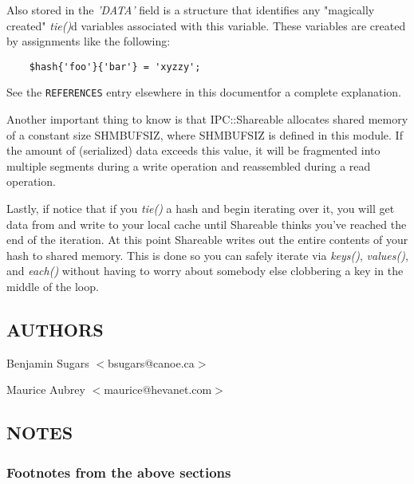 Also stored in the {\em 'DATA'\/} field is a structure that identifies any
"magically created" {\em tie()\/}d variables associated with this variable.
These variables are created by assignments like the following:
\begin{verbatim}
    $hash{'foo'}{'bar'} = 'xyzzy';
\end{verbatim}

See the {\tt REFERENCES} entry elsewhere in this documentfor a complete explanation.

Another important thing to know is that IPC::Shareable allocates
shared memory of a constant size SHM\underscore{}BUFSIZ, where SHM\underscore{}BUFSIZ is
defined in this module.  If the amount of (serialized) data exceeds
this value, it will be fragmented into multiple segments during a
write operation and reassembled during a read operation.

Lastly, if notice that if you {\em tie()\/} a hash and begin
iterating over it, you will get data from and write to
your local cache until Shareable thinks you've reached
the end of the iteration.  At this point Shareable
writes out the entire contents of your hash to shared
memory.  This is done so you can safely iterate via
{\em keys()\/}, {\em values()\/}, and {\em each()\/} without having to worry
about somebody else clobbering a key in the middle of
the loop.

\subsection*{AUTHORS}
Benjamin Sugars $<$bsugars@canoe.ca$>$

Maurice Aubrey $<$maurice@hevanet.com$>$

\subsection*{NOTES}
\subsubsection*{Footnotes from the above sections}%

